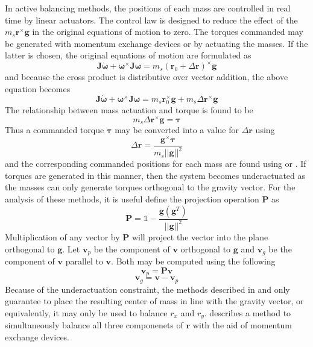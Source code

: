 In active balancing methods, the positions of each mass are controlled in real time by linear actuators. The control law is designed to reduce the effect of the $m_s\bm{r}^{\times}\bm{g}$ in the original equations of motion to zero. The torques commanded may be generated with momentum exchange devices or by actuating the masses. If the latter is chosen, the original equations of motion are formulated as
\begin{equation} \label{equation:EomWithTau}
    \bm{J}\dot{\bm{\omega}} + \bm{\omega}^\times \bm{J\omega} 
    = m_s(\bm{r}_0+\Delta\bm{r})^{\times}\bm{g}
\end{equation}
and because the cross product is distributive over vector addition, the above equation becomes
\begin{equation} \label{equation:EomWithTau}
    \bm{J}\dot{\bm{\omega}} + \bm{\omega}^\times \bm{J\omega} 
    = m_s\bm{r}_0^{\times}\bm{g} + m_s\Delta\bm{r}^{\times}\bm{g}
\end{equation}
The relationship between mass actuation and torque is found to be
\begin{equation} 
    m_s\Delta\bm{r}^{\times}\bm{g} = \bm{\tau}
\end{equation}
Thus a commanded torque $\bm{\tau}$ may be converted into a value for $\Delta\bm{r}$ using
\begin{equation}\label{equation:torque_to_del_r}
    \Delta\bm{r}=\frac{\bm{g}^{\times}\bm{\tau}}{m_s||\bm{g}||^2}
\end{equation}
and the corresponding commanded positions for each mass are found using  or . If torques are generated in this manner, then the system becomes underactuated as the masses can only generate torques orthogonal to the gravity vector. For the analysis of these methods, it is useful define the projection operation $\bm{P}$ as
\begin{equation}
    \bm{P}=\mathbb{1}-\frac{\bm{g}(\bm{g}^T)}{||\bm{g}||^2}
\end{equation}
Multiplication of any vector by $\bm{P}$ will project the vector into the plane orthogonal to  $\bm{g}$. Let $\bm{v}_p$ be the component of $\bm{v}$ orthogonal to $\bm{g}$ and $\bm{v}_g$ be the component of $\bm{v}$ parallel to $\bm{v}$. Both may be computed using the following
\begin{equation}
    \bm{v}_p = \bm{Pv}
\end{equation}
\begin{equation}
    \bm{v}_g=\bm{v}-\bm{v}_p
\end{equation}
Because of the underactuation constraint, the methods described in  and  only guarantee to place the resulting center of mass in line with the gravity vector, or equivalently, it may only be used to balance $r_x$ and $r_y$.  describes a method to simultaneously balance all three componenets of $\bm{r}$ with the aid of momentum exchange devices. 

